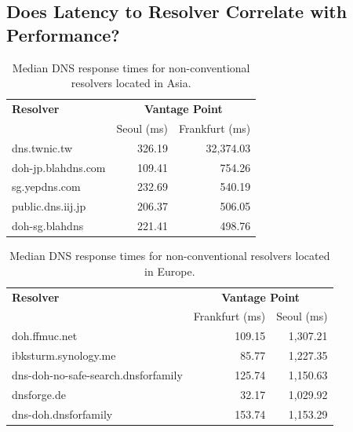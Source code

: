 \subsection{Does Latency to Resolver Correlate with Performance?}
\begin{table}[t!]
\centering
\begin{tabular}{l|rr}
\toprule
    \textbf{Resolver} & \multicolumn{2}{c}{\textbf{Vantage Point}} \\
                  & \textrm{Seoul (ms)}         & \textrm{Frankfurt (ms)} \\
\midrule
dns.twnic.tw                                & 326.19 & 32,374.03                            \\
doh-jp.blahdns.com                          & 109.41                                           & 754.26                              \\
sg.yepdns.com                               & 232.69                                           & 540.19                              \\
public.dns.iij.jp                           & 206.37                                           & 506.05                              \\
doh-sg.blahdns                              & 221.41                                           & 498.76                              \\
\bottomrule
\end{tabular}
\caption{Median DNS response times for non-conventional resolvers located in Asia.}
\label{tab:UnconvAsia}
\end{table}

\begin{table}[t!]
\centering
\begin{tabular}{l|rr}
\toprule
\textbf{Resolver} & \multicolumn{2}{c}{\textbf{Vantage Point}} \\
                  & \textrm{Frankfurt (ms)}     & \textrm{Seoul (ms)} \\
\midrule
doh.ffmuc.net                               & 109.15 & 1,307.21                         \\
ibksturm.synology.me                        & 85.77 & 1,227.35                         \\
dns-doh-no-safe-search.dnsforfamily         & 125.74 & 1,150.63                         \\
dnsforge.de                                 & 32.17 & 1,029.92                         \\
dns-doh.dnsforfamily                        & 153.74 & 1,153.29                         \\
\bottomrule
\end{tabular}
\caption{Median DNS response times for non-conventional resolvers located in Europe.}
\label{tab:UnconvEur}
\end{table}

